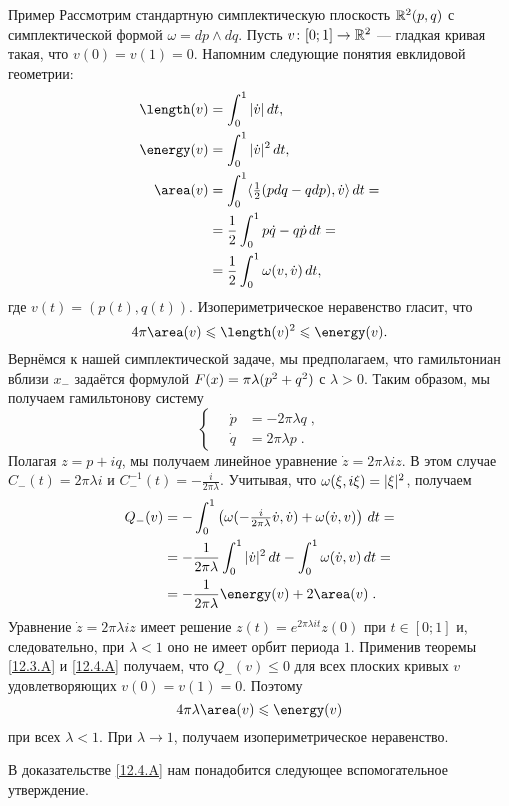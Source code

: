 \begin{ex*}{Пример}
Рассмотрим стандартную симплектическую плоскость $\mathbb{R}^2(p, q)$ с
симплектической формой $\omega = dp \wedge dq$. 
Пусть $v\colon [0;1] \to\mathbb{R}^2$ — гладкая кривая такая, что $v(0)=v(1)=0$.
Напомним следующие понятия евклидовой геометрии: 
\begin{align*}
\length(v)&=\int_0^1|\dot v|\,\d t,
\\
\energy(v)&=\int_0^1|\dot v|^2\,\d t,
\\
\area(v)&=\int_0^1\langle \tfrac12(p\d q-q\d p),\dot v\rangle\,\d t=
\\
&=\frac12\int_0^1 p\dot q-q\dot p\,\d t=
\\
&=\frac12\int_0^1\omega(v,\dot v)\,\d t,
\end{align*}
где $v(t) = (p(t), q(t))$.
Изопериметрическое неравенство гласит, что
\[4\pi\area(v)\le\length(v)^2\le \energy(v).\]
Вернёмся к нашей симплектической задаче, мы предполагаем, что
гамильтониан вблизи $x_-$ задаётся формулой $F(x) = \pi \lambda(p^2
\z+ q^2)$ с $\lambda > 0$. 
Таким образом, мы получаем гамильтонову систему 
\[
\begin{cases}
\quad\dot p &= -2\pi\lambda q\;,
\\
\quad\dot q &= 2\pi\lambda p\;.
\end{cases}
\]
Полагая $z = p + iq$, мы получаем линейное уравнение $\dot z = 2\pi
\lambda iz$. 
В этом случае $C_-(t) = 2\pi\lambda i$ и $C_-^{-1}(t) = -\frac i{2\pi\lambda}$.
Учитывая, что $\omega(\xi,i\xi) \z= |\xi|^2$, получаем
\begin{align*}
Q_-(v)&=-\int_0^1\left(\omega(-\tfrac i{2\pi\lambda}\dot v,\dot
v)+\omega(\dot v, v)\right)\,dt= 
\\
&=-\frac 1{2\pi\lambda}\int_0^1|\dot v|^2\,dt-\int_0^1\omega(\dot v,v)\,dt=
\\
&=-\frac 1{2\pi\lambda}\energy(v)+2\area(v)\;.
\end{align*}
Уравнение $\dot z = 2\pi\lambda iz$ имеет решение $z(t) =
e^{2\pi\lambda it}z(0)$ при $t \in [0;1]$ и, следовательно, при
$\lambda < 1$ оно не имеет орбит периода $1$. 
Применив теоремы \ref{12.3.A} и \ref{12.4.A} получаем, что $Q_-(v)\le
0$ для всех плоских кривых $v$ удовлетворяющих $v(0) = v(1) = 0$. 
Поэтому 
\[4\pi \lambda \area(v) \le \energy (v)\]
при всех $\lambda < 1$.
При $\lambda\to1$, получаем изопериметрическое неравенство.
\end{ex*}

В доказательстве \ref{12.4.A} нам понадобится следующее вспомогательное утверждение.


